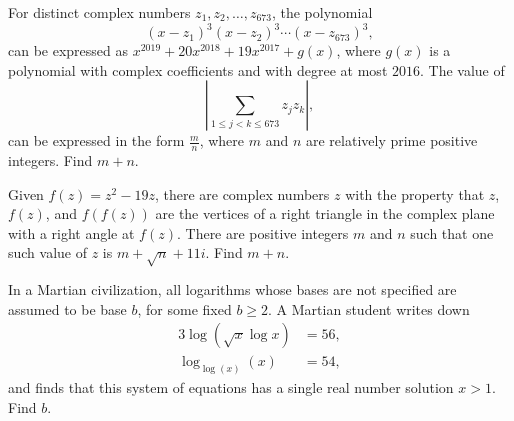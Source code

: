\documentclass[11pt]{article}
\theoremstyle{definition}
\begin{document}
\begin{question}[name={2019 AIME I, \href{https://artofproblemsolving.com/community/c4p11972643}{Problem 10}}]
	For distinct complex numbers $z_1,z_2,\dots,z_{673}$, the polynomial
	\[ (x-z_1)^3(x-z_2)^3 \cdots (x-z_{673})^3, \]can be expressed as $x^{2019} + 20x^{2018} + 19x^{2017}+g(x)$, where $g(x)$ is a polynomial with complex coefficients and with degree at most $2016$. The value of
	\[ \left| \sum_{1 \le j <k \le 673} z_jz_k \right|, \]can be expressed in the form $\tfrac{m}{n}$, where $m$ and $n$ are relatively prime positive integers. Find $m+n$.
\end{question}


%	












\begin{question}[name={2019 AIME I, \href{https://artofproblemsolving.com/community/c4p11972694}{Problem 12}}]
	Given $f(z) = z^2-19z$, there are complex numbers $z$ with the property that $z$, $f(z)$, and $f(f(z))$ are the vertices of a right triangle in the complex plane with a right angle at $f(z)$. There are positive integers $m$ and $n$ such that one such value of $z$ is $m+\sqrt{n}+11i$. Find $m+n$.
\end{question}


%	











\begin{question}[name={2019 AIME II, \href{https://artofproblemsolving.com/community/c4p12030324}{Problem 6}}]
	In a Martian civilization, all logarithms whose bases are not specified are assumed to be base $b$, for some fixed $b \geq 2$. A Martian student writes down
	\begin{align*}
		3 \log(\sqrt{x}\log x) &= 56,\\
		\log_{\log (x)}(x) &= 54,
	\end{align*}
	and finds that this system of equations has a single real number solution $x > 1$. Find $b$.
\end{question}
\end{document}

